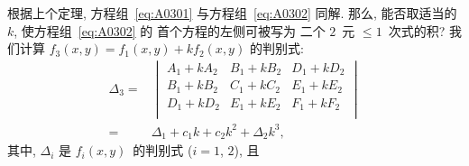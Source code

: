 根据上个定理,
方程组~\eqref{eq:A0301} 与方程组~\eqref{eq:A0302}
同解.
那么, 能否取适当的 \(k\),
使方程组~\eqref{eq:A0302} 的%
首个方程的左侧可被写为%
二个 \(2\)~元 \({\leq} 1\)~次式的积?
我们计算 \(f_3 (x, y) = f_1 (x, y) + kf_2 (x, y)\)
的判别式:
\begin{align*}
    \Delta_3
    = {} & \begin{vmatrix}
               A_1 + kA_2 & B_1 + kB_2 & D_1 + kD_2 \\
               B_1 + kB_2 & C_1 + kC_2 & E_1 + kE_2 \\
               D_1 + kD_2 & E_1 + kE_2 & F_1 + kF_2 \\
           \end{vmatrix}       \\
    = {} & \Delta_1 + c_1 k + c_2 k^2 + \Delta_2 k^3,
\end{align*}
其中, \(\Delta_i\) 是 \(f_i (x, y)\)~的判别式
(\(i = 1\), \(2\)), 且
